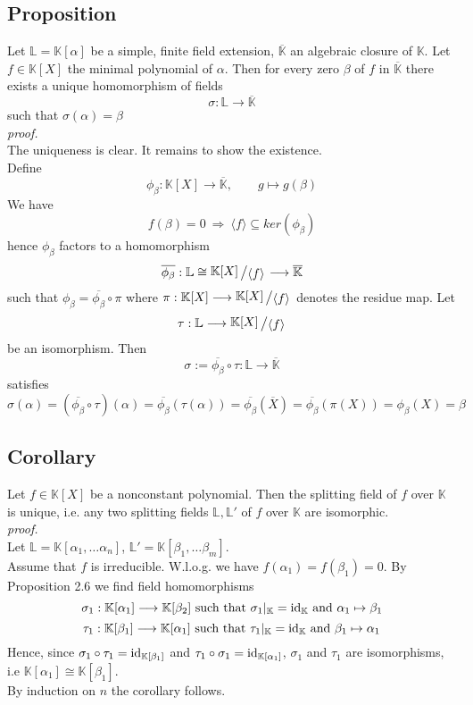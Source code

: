 \documentclass[12pt]{book}
\newcommand{\slant}[2]{{\raisebox{.1em}{$#1$}\left/\raisebox{-.1em}{$#2$}\right.}}
\begin{document}
\begin{spacing}{1.3}
\subsection{Proposition} %
Let $\mathbb{L}=\mathbb{K}[\alpha]$ be a simple, finite field extension, $\overline{\mathbb{K}}$ an algebraic closure of $\mathbb{K}$. Let $f \in \mathbb{K}[X]$ the minimal polynomial of $\alpha$. Then for every zero $\beta$ of $f$ in $\overline{\mathbb{K}}$ there exists a unique homomorphism of fields $$\sigma: \mathbb{L} \longrightarrow \overline{\mathbb{K}}$$ such that $\sigma(\alpha)=\beta$\\
\textit{proof.}\\
The uniqueness is clear. It remains to show the existence.\\
Define $$\phi_{\beta}:\mathbb{K}[X] \longrightarrow \overline{\mathbb{K}}, \qquad g \mapsto g(\beta)$$We have $$f(\beta)=0 \ \Longrightarrow \ \langle f \rangle \subseteq ker(\phi_{\beta})$$hence $\phi_{\beta}$ factors to a homomorphism $$\overline{\phi_{\beta}}: \mathbb{L} \cong \slant{\mathbb{K}[X]}{\langle f \rangle} \longrightarrow \overline{\mathbb{K}}$$such that $\phi_{\beta}=\overline{\phi_{\beta}}\circ \pi$ where $\pi: \mathbb{K}[X] \longrightarrow \slant{\mathbb{K}[X]}{\langle f \rangle}$ denotes the residue map. Let $$\tau: \mathbb{L} \longrightarrow \slant{\mathbb{K}[X]}{\langle f \rangle}$$ be an isomorphism. Then
$$\sigma:= \overline{\phi_{\beta}} \circ \tau: \mathbb{L} \longrightarrow \overline{\mathbb{K}}$$ satisfies $$\sigma(\alpha)=\left(\overline{\phi_{\beta}} \circ \tau\right)(\alpha)=\overline{\phi_{\beta}}\left(\tau(\alpha)\right)=\overline{\phi_{\beta}}(\overline{X})=\overline{\phi_{\beta}}\left(\pi(X)\right)=\phi_{\beta}(X)=\beta$$

\subsection{Corollary} %
Let $f \in \mathbb{K}[X]$ be a nonconstant polynomial. Then the splitting field of $f$ over $\mathbb{K}$ is unique, i.e. any two splitting fields $\mathbb{L}, \mathbb{L}'$ of $f$ over $\mathbb{K}$ are isomorphic.\\
\textit{proof.}\\
Let $\mathbb{L}=\mathbb{K}[\alpha_1, \dots \alpha_n]$, $\mathbb{L}'=\mathbb{K}[\beta_1, \dots \beta_m]$.\\
Assume that $f$ is irreducible. W.l.o.g. we have $f(\alpha_1)=f(\beta_1)=0$. By Proposition 2.6 we find field homomorphisms\\
$$\sigma_1: \mathbb{K}[\alpha_1] \longrightarrow \mathbb{K}[\beta_2] \textrm{ such that }\sigma_1 |_{\mathbb{K}}=\rm{id}_{\mathbb{K}}\textrm{ and }\alpha_1 \mapsto \beta_1$$
$$\tau_1: \mathbb{K}[\beta_1] \longrightarrow \mathbb{K}[\alpha_1] \textrm{ such that }\tau_1 |_{\mathbb{K}}=\rm{id}_{\mathbb{K}}\textrm{ and }\beta_1 \mapsto \alpha_1$$
Hence, since $\sigma_1 \circ \tau_1 = \rm{id}_{\mathbb{K}[\beta_1]}$ and $\tau_1 \circ \sigma_1 = \rm{id}_{\mathbb{K}[\alpha_1]}$, $\sigma_1$ and $\tau_1$ are isomorphisms, i.e $\mathbb{K}[\alpha_1] \cong \mathbb{K}[\beta_1]$.\\
By induction on $n$ the corollary follows.


\end{spacing}
\end{document}
